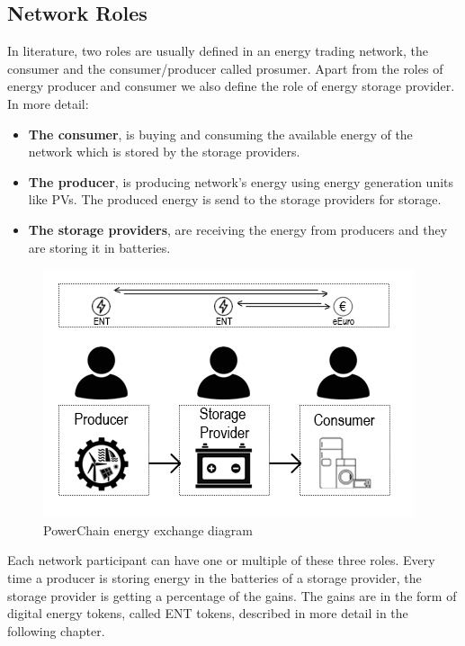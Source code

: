 \subsection{Network Roles}
In literature, two roles are usually defined in an energy trading network, the consumer and the consumer/producer called prosumer.
Apart from the roles of energy producer and consumer we also define the role of energy storage provider. In more detail:
\begin{itemize}
    \item \textbf{The consumer}, is buying and consuming the available energy of the network which is stored by the storage providers.
    \item \textbf{The producer}, is producing network's energy using energy generation units like PVs. The produced energy is send to the storage providers for storage.
    \item \textbf{The storage providers}, are receiving the energy from producers and they are storing it in batteries.
\end{itemize}
\begin{figure}[h!]
    \centering
    \includegraphics[scale=0.6]{Figures/powerchain_scheme.png}
    \caption{PowerChain energy exchange diagram}
\end{figure}
Each network participant can have one or multiple of these three roles. Every time a producer is storing energy in the batteries of a storage provider, the storage provider is getting
a percentage of the gains. The gains are in the form of digital energy tokens, called ENT tokens, described in more detail in the following chapter. \\

